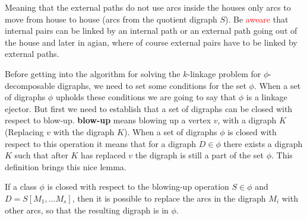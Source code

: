 Meaning that the external paths do not use arcs inside the houses only arcs to move from house to house (arcs from the quotient digraph $S$). 
Be \textcolor{red}{aweare} that internal pairs can be linked by an internal path or an external path going out of the house and later in agian, where of course external pairs have to be linked by external paths. 

Before getting into the algorithm for solving the $k$-linkage problem for $\phi$-decomposable digraphs, we need to set some conditions for the set $\phi$. 
When a set of digraphs $\phi$ upholds these conditions we are going to say that $\phi$ is a linkage ejector. 
But first we need to establish that a set of digraphs can be closed with respect to blow-up.
\textbf{blow-up} means blowing up a vertex $v$, with a digraph $K$(Replacing $v$ with the digraph $K$).
When a set of digraphs $\phi$ is closed with respect to this operation it means that for a digraph $D\in \phi$ there exists a digraph $K$ such that after $K$ has replaced $v$ the digraph is still a part of the set $\phi$. 
This definition brings this nice lemma.

\begin{lemma}
    If a class $\phi$ is closed with respect to the blowing-up operation $S\in \phi$ and $D=S[M_1,\dots M_s]$, then it is possible to replace the arcs in the digraph $M_i$ with other arcs, so that the resulting digraph is in $\phi$. 
    \label{lemma:replace} 
\end{lemma}


